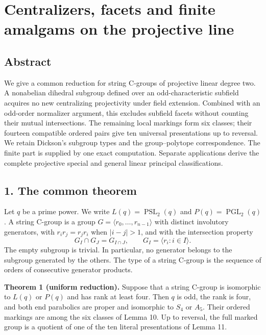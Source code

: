 \documentclass[
  11pt,
  a4paper,
]{article}
\author{}
\date{}
\begin{document}
\section{Centralizers, facets and finite amalgams on the projective
line}\label{centralizers-facets-and-finite-amalgams-on-the-projective-line}

\subsection{Abstract}\label{abstract}

We give a common reduction for string C-groups of projective linear
degree two. A nonabelian dihedral subgroup defined over an
odd-characteristic subfield acquires no new centralizing projectivity
under field extension. Combined with an odd-order normalizer argument,
this excludes subfield facets without counting their mutual
intersections. The remaining local markings form six classes; their
fourteen compatible ordered pairs give ten universal presentations up to
reversal. We retain Dickson's subgroup types and the group--polytope
correspondence. The finite part is supplied by one exact computation.
Separate applications derive the complete projective special and general
linear principal classifications.

\subsection{1. The common theorem}\label{the-common-theorem}

Let \(q\) be a prime power. We write \(L(q)=\operatorname{PSL}_2(q)\)
and \(P(q)=\operatorname{PGL}_2(q)\). A string C-group is a group
\(G=\langle r_0,\ldots,r_{n-1}\rangle\) with distinct involutory
generators, with \(r_i r_j=r_j r_i\) when \(|i-j|>1\), and with the
intersection property \[
 G_I\cap G_J=G_{I\cap J},\qquad G_I=\langle r_i:i\in I\rangle.
 \tag{1}
\] The empty subgroup is trivial. In particular, no generator belongs to
the subgroup generated by the others. The type of a string C-group is
the sequence of orders of consecutive generator products.

\textbf{Theorem 1 (uniform reduction).} Suppose that a string C-group is
isomorphic to \(L(q)\) or \(P(q)\) and has rank at least four. Then
\(q\) is odd, the rank is four, and both end parabolics are proper and
isomorphic to \(S_4\) or \(A_5\). Their ordered markings are among the
six classes of Lemma 10. Up to reversal, the full marked group is a
quotient of one of the ten literal presentations of Lemma 11.
\end{document}
